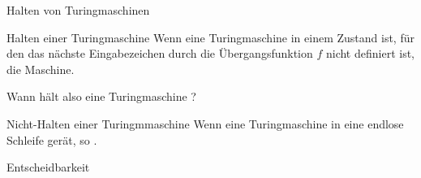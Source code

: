 \begin{frame}{Halten von Turingmaschinen}
	
	\p
	
	\begin{block}{Halten einer Turingmaschine}
		Wenn eine Turingmaschine in einem Zustand ist, für den das nächste Eingabezeichen durch die Übergangsfunktion $f$ nicht definiert ist,  die Maschine.
	\end{block}

	\bp

	Wann hält also eine Turingmaschine ?
	
	\begin{block}{Nicht-Halten einer Turingmmaschine}
		Wenn eine Turingmaschine in eine endlose Schleife gerät, so .
	\end{block}
\end{frame}

\begin{frame}{Entscheidbarkeit}
\end{frame}

